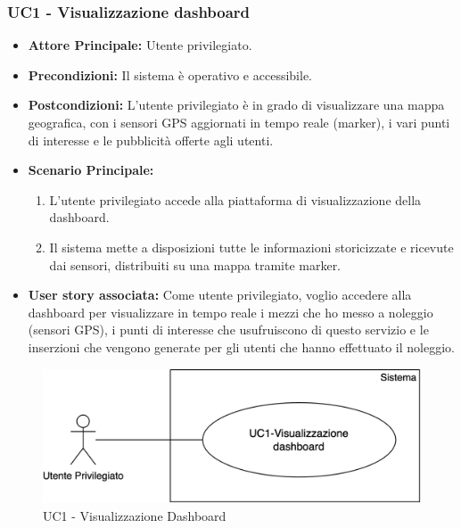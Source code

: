 \documentclass[11pt]{article}
\begin{document}
\begin{justify}
\subsubsection{\textbf{UC1 - Visualizzazione dashboard}}
\begin{itemize}
    \item \textbf{Attore Principale:} Utente privilegiato.
    \item \textbf{Precondizioni:} Il sistema è operativo e accessibile.
    \item \textbf{Postcondizioni:} L'utente privilegiato è in grado di visualizzare una mappa geografica, con i sensori GPS aggiornati in tempo reale (marker), i vari punti di interesse e le pubblicità offerte agli utenti.
    \item \textbf{Scenario Principale:}
        \begin{enumerate}
            \item L'utente privilegiato accede alla piattaforma di visualizzazione della dashboard.
            \item Il sistema mette a disposizioni tutte le informazioni storicizzate e ricevute dai sensori, distribuiti su una mappa tramite marker.
        \end{enumerate}
    \item \textbf{User story associata:} Come utente privilegiato, voglio accedere alla dashboard per visualizzare in tempo reale i mezzi che ho messo a noleggio (sensori GPS), i punti di interesse che usufruiscono di questo servizio e le inserzioni che vengono generate per gli utenti che hanno effettuato il noleggio.
\end{itemize}
\begin{figure}[H]
    \centering
    \includegraphics[width=0.5\linewidth]{UC1image.png}
    \caption{UC1 - Visualizzazione Dashboard}
    \label{fig:UC1}
\end{figure}

\end{justify}
\end{document}
